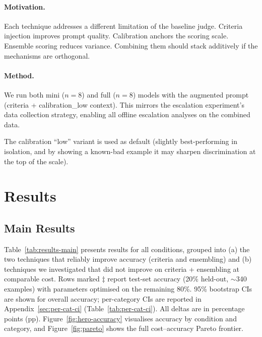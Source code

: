 \documentclass{article}
\begin{document}
\paragraph{Motivation.} Each technique addresses a different limitation of the baseline judge. Criteria injection improves prompt quality. Calibration anchors the scoring scale. Ensemble scoring reduces variance. Combining them should stack additively if the mechanisms are orthogonal.

\paragraph{Method.} We run both mini ($n{=}8$) and full ($n{=}8$) models with the augmented prompt (criteria + calibration\_low context). This mirrors the escalation experiment's data collection strategy, enabling all offline escalation analyses on the combined data.

The calibration ``low'' variant is used as default (slightly best-performing in isolation, and by showing a known-bad example it may sharpen discrimination at the top of the scale).

\section{Results}
\label{sec:experiments}

\subsection{Main Results}
\label{sec:main-results}

Table~\ref{tab:results-main} presents results for all conditions, grouped into (a) the two techniques that reliably improve accuracy (criteria and ensembling) and (b) techniques we investigated that did not improve on criteria + ensembling at comparable cost. Rows marked $\ddagger$ report test-set accuracy (20\% held-out, ${\sim}$340 examples) with parameters optimised on the remaining 80\%. 95\% bootstrap CIs are shown for overall accuracy; per-category CIs are reported in Appendix~\ref{sec:per-cat-ci} (Table~\ref{tab:per-cat-ci}). All deltas are in percentage points (pp). Figure~\ref{fig:hero-accuracy} visualises accuracy by condition and category, and Figure~\ref{fig:pareto} shows the full cost--accuracy Pareto frontier.
\end{document}
